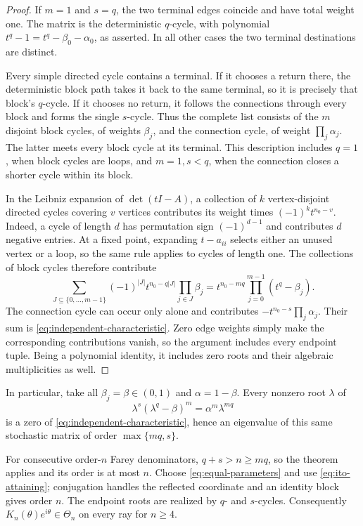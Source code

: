 \documentclass[11pt,a4paper]{article}
\theoremstyle{definition}
\theoremstyle{remark}
\numberwithin{equation}{section}
\begin{document}
\begin{proof}
If $m=1$ and $s=q$, the two terminal edges coincide and have total
weight one. The matrix is the deterministic $q$-cycle, with polynomial
$t^q-1=t^q-\beta_0-\alpha_0$, as asserted. In all other cases the
two terminal destinations are distinct.

Every simple directed cycle contains a terminal. If it chooses a return
there, the deterministic block path takes it back to the same terminal,
so it is precisely that block's $q$-cycle. If it chooses no return, it
follows the connections through every block and forms the single
$s$-cycle. Thus the complete list consists of the $m$ disjoint block
cycles, of weights $\beta_j$, and the connection cycle, of weight
$\prod_j\alpha_j$. The latter meets every block cycle at its terminal.
This description includes $q=1$, when block cycles are loops, and
$m=1,s<q$, when the connection closes a shorter cycle within its block.

In the Leibniz expansion of $\det(tI-A)$, a collection of $k$
vertex-disjoint directed cycles covering $v$ vertices contributes its
weight times $(-1)^k t^{n_0-v}$. Indeed, a cycle of length $d$ has
permutation sign $(-1)^{d-1}$ and contributes $d$ negative entries.
At a fixed point, expanding $t-a_{ii}$ selects either an unused vertex
or a loop, so the same rule applies to cycles of length one.
The collections of block cycles therefore contribute
\[
 \sum_{J\subseteq\{0,\ldots,m-1\}}
 (-1)^{|J|}t^{n_0-q|J|}\prod_{j\in J}\beta_j
 =t^{n_0-mq}\prod_{j=0}^{m-1}(t^q-\beta_j).
\]
The connection cycle can occur only alone and contributes
$-t^{n_0-s}\prod_j\alpha_j$. Their sum is
\eqref{eq:independent-characteristic}. Zero edge weights simply make
the corresponding contributions vanish, so the argument includes every
endpoint tuple. Being a polynomial identity, it includes zero roots
and their algebraic multiplicities as well.
\end{proof}

In particular, take all $\beta_j=\beta\in(0,1)$ and
$\alpha=1-\beta$. Every nonzero root $\lambda$ of
\begin{equation}\label{eq:realizing-polynomial}
 \lambda^s(\lambda^q-\beta)^m=\alpha^m\lambda^{mq}
\end{equation}
is a zero of \eqref{eq:independent-characteristic}, hence an eigenvalue
of this same stochastic matrix of order $\max\{mq,s\}$.

For consecutive order-$n$ Farey denominators, $q+s>n\ge mq$, so the theorem
applies and its order is at most $n$.
Choose \eqref{eq:equal-parameters} and use \eqref{eq:ito-attaining};
conjugation handles the reflected coordinate and an identity block gives
order $n$.  The endpoint roots are realized by $q$- and $s$-cycles.
Consequently $K_n(\theta)e^{i\theta}\in\Theta_n$ on every ray for $n\ge4$.
\end{document}
